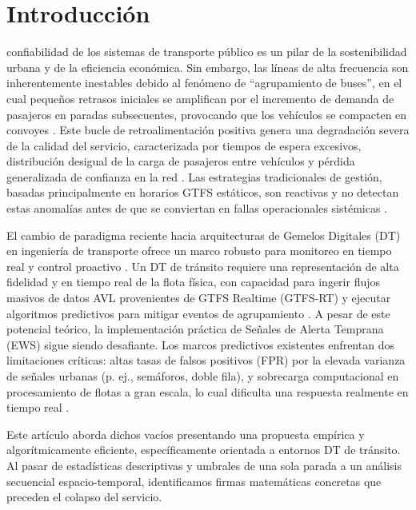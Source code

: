 \documentclass[journal,twocolumn]{IEEEtran}
\begin{document}
\section{Introducción}
 confiabilidad de los sistemas de transporte público es un pilar de la sostenibilidad urbana y de la eficiencia económica. Sin embargo, las líneas de alta frecuencia son inherentemente inestables debido al fenómeno de ``agrupamiento de buses'', en el cual pequeños retrasos iniciales se amplifican por el incremento de demanda de pasajeros en paradas subsecuentes, provocando que los vehículos se compacten en convoyes \cite{1,2}. Este bucle de retroalimentación positiva genera una degradación severa de la calidad del servicio, caracterizada por tiempos de espera excesivos, distribución desigual de la carga de pasajeros entre vehículos y pérdida generalizada de confianza en la red \cite{3}. Las estrategias tradicionales de gestión, basadas principalmente en horarios GTFS estáticos, son reactivas y no detectan estas anomalías antes de que se conviertan en fallas operacionales sistémicas \cite{4}.

El cambio de paradigma reciente hacia arquitecturas de Gemelos Digitales (DT) en ingeniería de transporte ofrece un marco robusto para monitoreo en tiempo real y control proactivo \cite{5,6}. Un DT de tránsito requiere una representación de alta fidelidad y en tiempo real de la flota física, con capacidad para ingerir flujos masivos de datos AVL provenientes de GTFS Realtime (GTFS-RT) y ejecutar algoritmos predictivos para mitigar eventos de agrupamiento \cite{7}. A pesar de este potencial teórico, la implementación práctica de Señales de Alerta Temprana (EWS) sigue siendo desafiante. Los marcos predictivos existentes enfrentan dos limitaciones críticas: altas tasas de falsos positivos (FPR) por la elevada varianza de señales urbanas (p. ej., semáforos, doble fila), y sobrecarga computacional en procesamiento de flotas a gran escala, lo cual dificulta una respuesta realmente en tiempo real \cite{8,9}.

Este artículo aborda dichos vacíos presentando una propuesta empírica y algorítmicamente eficiente, específicamente orientada a entornos DT de tránsito. Al pasar de estadísticas descriptivas y umbrales de una sola parada a un análisis secuencial espacio-temporal, identificamos firmas matemáticas concretas que preceden el colapso del servicio.
\end{document}
